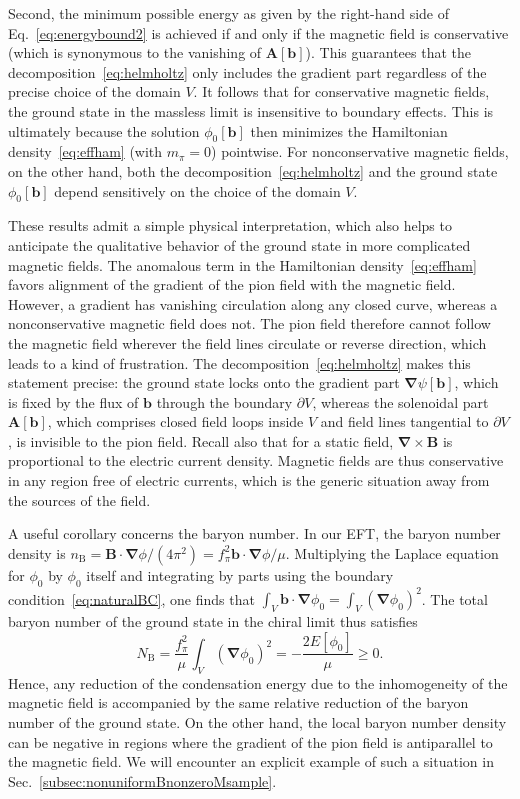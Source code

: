 \documentclass[pdflatex,iicol,sn-mathphys-num]{sn-jnl}
\let\m=\mu
\let\p=\phi
\let\de=\partial
\newcommand{\vek}[1]{\bm{#1}}%
\newcommand{\grad}{\vek\nabla}%
\newcommand{\bmag}{b}%
\begin{document}
Second, the minimum possible energy as given by the right-hand side of Eq.~\eqref{eq:energybound2} is achieved if and only if the magnetic field is conservative (which is synonymous to the vanishing of $\vek A[\vek\bmag]$). This guarantees that the decomposition~\eqref{eq:helmholtz} only includes the gradient part regardless of the precise choice of the domain $V$. It follows that for conservative magnetic fields, the ground state in the massless limit is insensitive to boundary effects. This is ultimately because the solution $\p_0[\vek\bmag]$ then minimizes the Hamiltonian density~\eqref{eq:effham} (with $m_\pi=0$) pointwise. For nonconservative magnetic fields, on the other hand, both the decomposition~\eqref{eq:helmholtz} and the ground state $\p_0[\vek\bmag]$ depend sensitively on the choice of the domain $V$.

These results admit a simple physical interpretation, which also helps to anticipate the qualitative behavior of the ground state in more complicated magnetic fields. The anomalous term in the Hamiltonian density~\eqref{eq:effham} favors alignment of the gradient of the pion field with the magnetic field. However, a gradient has vanishing circulation along any closed curve, whereas a nonconservative magnetic field does not. The pion field therefore cannot follow the magnetic field wherever the field lines circulate or reverse direction, which leads to a kind of frustration. The decomposition~\eqref{eq:helmholtz} makes this statement precise: the ground state locks onto the gradient part $\grad\psi[\vek\bmag]$, which is fixed by the flux of $\vek\bmag$ through the boundary $\de V$, whereas the solenoidal part $\vek A[\vek\bmag]$, which comprises closed field loops inside $V$ and field lines tangential to $\de V$, is invisible to the pion field. Recall also that for a static field, $\grad\times\vek B$ is proportional to the electric current density. Magnetic fields are thus conservative in any region free of electric currents, which is the generic situation away from the sources of the field.

A useful corollary concerns the baryon number. In our EFT, the baryon number density is $n_\text{B}=\vek B\cdot\grad\p/(4\pi^2)=f_\pi^2\vek\bmag\cdot\grad\p/\m$. Multiplying the Laplace equation for $\p_0$ by $\p_0$ itself and integrating by parts using the boundary condition~\eqref{eq:naturalBC}, one finds that $\int_V\vek\bmag\cdot\grad\p_0=\int_V(\grad\p_0)^2$. The total baryon number of the ground state in the chiral limit thus satisfies
\begin{equation}
N_\text{B}=\frac{f_\pi^2}{\m}\int_V(\grad\p_0)^2=-\frac{2E[\p_0]}{\m}\geq0.
\label{eq:baryonnumber}
\end{equation}
Hence, any reduction of the condensation energy due to the inhomogeneity of the magnetic field is accompanied by the same relative reduction of the baryon number of the ground state. On the other hand, the local baryon number density can be negative in regions where the gradient of the pion field is antiparallel to the magnetic field. We will encounter an explicit example of such a situation in Sec.~\ref{subsec:nonuniformBnonzeroMsample}.
\end{document}
